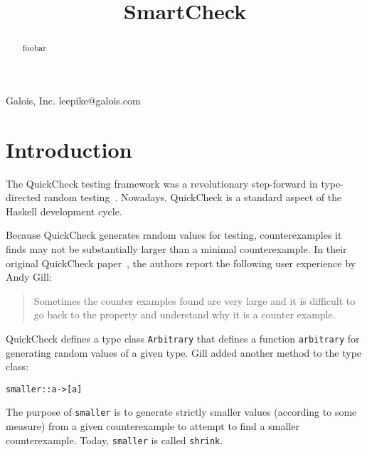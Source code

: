\documentclass[9pt]{sigplanconf}
\newenvironment{code}{\begin{alltt}\scriptsize}{\end{alltt}}
\newcommand{\ttp}[1]{\texttt{#1}}
\begin{document}


\title{SmartCheck}

           {Galois, Inc.}
           {leepike@galois.com}
\maketitle

\begin{abstract}
foobar
\end{abstract}





\section{Introduction}\label{sec:intro}

The QuickCheck testing framework was a revolutionary step-forward in
type-directed random testing~\cite{qc}.  Nowadays, QuickCheck is a standard
aspect of the Haskell development cycle.  

Because QuickCheck generates
random values for testing, counterexamples it finds may not be substantially
larger than a minimal counterexample.  In their original QuickCheck
paper~\cite{qc}, the authors report the following user experience by Andy Gill:
%
\begin{quote}
Sometimes the counter examples found are very large and it is difficult to go
back to the property and understand why it is a counter example.
\end{quote}
%
\noindent
QuickCheck defines a type class \ttp{Arbitrary} that defines a function
\ttp{arbitrary} for generating random values of a given type.  Gill added another
method to the type class:
%
\begin{code}
smaller :: a -> [a] 
\end{code}
%
\noindent
The purpose of \ttp{smaller} is to generate strictly smaller values (according to
some measure) from a given counterexample to attempt to find a smaller
counterexample.  Today, \ttp{smaller} is called \ttp{shrink}.
\end{document}
